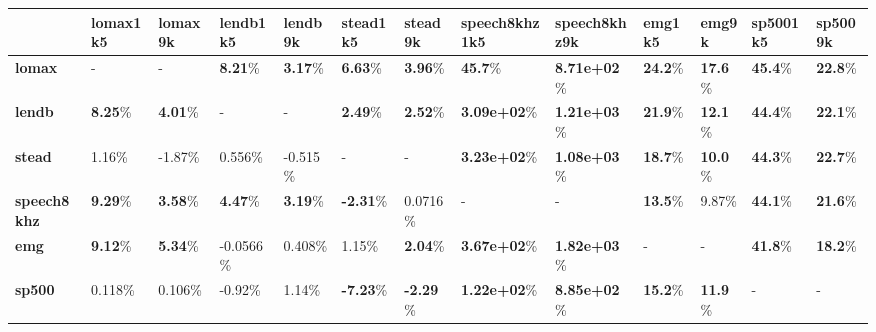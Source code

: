 \begin{table}[]
\begin{adjustwidth}{-1in}{-1in} %
\begin{tabular}{|l|l|l|l|l|l|l|l|l|l|l|l|l|}
\hline
  & \textbf{lomax1k5} & \textbf{lomax9k} & \textbf{lendb1k5} & \textbf{lendb9k} & \textbf{stead1k5} & \textbf{stead9k} & \textbf{speech8khz1k5} & \textbf{speech8khz9k} & \textbf{emg1k5} & \textbf{emg9k} & \textbf{sp5001k5} & \textbf{sp5009k}\\ \hline
\textbf{lomax} & - & - & \cellcolor{green}\textbf{8.21}\% & \cellcolor{green}\textbf{3.17}\% & \cellcolor{green}\textbf{6.63}\% & \cellcolor{green}\textbf{3.96}\% & \cellcolor{green}\textbf{45.7}\% & \cellcolor{green}\textbf{8.71e+02}\% & \cellcolor{green}\textbf{24.2}\% & \cellcolor{green}\textbf{17.6}\% & \cellcolor{green}\textbf{45.4}\% & \cellcolor{green}\textbf{22.8}\% \\ \hline
\textbf{lendb} & \cellcolor{green}\textbf{8.25}\% & \cellcolor{green}\textbf{4.01}\% & - & - & \cellcolor{green}\textbf{2.49}\% & \cellcolor{green}\textbf{2.52}\% & \cellcolor{green}\textbf{3.09e+02}\% & \cellcolor{green}\textbf{1.21e+03}\% & \cellcolor{green}\textbf{21.9}\% & \cellcolor{green}\textbf{12.1}\% & \cellcolor{green}\textbf{44.4}\% & \cellcolor{green}\textbf{22.1}\% \\ \hline
\textbf{stead} & 1.16\% & -1.87\% & 0.556\% & -0.515\% & - & - & \cellcolor{green}\textbf{3.23e+02}\% & \cellcolor{green}\textbf{1.08e+03}\% & \cellcolor{green}\textbf{18.7}\% & \cellcolor{green}\textbf{10.0}\% & \cellcolor{green}\textbf{44.3}\% & \cellcolor{green}\textbf{22.7}\% \\ \hline
\textbf{speech8khz} & \cellcolor{green}\textbf{9.29}\% & \cellcolor{green}\textbf{3.58}\% & \cellcolor{green}\textbf{4.47}\% & \cellcolor{green}\textbf{3.19}\% & \cellcolor{red}\textbf{-2.31}\% & 0.0716\% & - & - & \cellcolor{green}\textbf{13.5}\% & 9.87\% & \cellcolor{green}\textbf{44.1}\% & \cellcolor{green}\textbf{21.6}\% \\ \hline
\textbf{emg} & \cellcolor{green}\textbf{9.12}\% & \cellcolor{green}\textbf{5.34}\% & -0.0566\% & 0.408\% & 1.15\% & \cellcolor{green}\textbf{2.04}\% & \cellcolor{green}\textbf{3.67e+02}\% & \cellcolor{green}\textbf{1.82e+03}\% & - & - & \cellcolor{green}\textbf{41.8}\% & \cellcolor{green}\textbf{18.2}\% \\ \hline
\textbf{sp500} & 0.118\% & 0.106\% & -0.92\% & 1.14\% & \cellcolor{red}\textbf{-7.23}\% & \cellcolor{red}\textbf{-2.29}\% & \cellcolor{green}\textbf{1.22e+02}\% & \cellcolor{green}\textbf{8.85e+02}\% & \cellcolor{green}\textbf{15.2}\% & \cellcolor{green}\textbf{11.9}\% & - & - \\ \hline
\end{tabular}
\end{adjustwidth}
\end{table}
